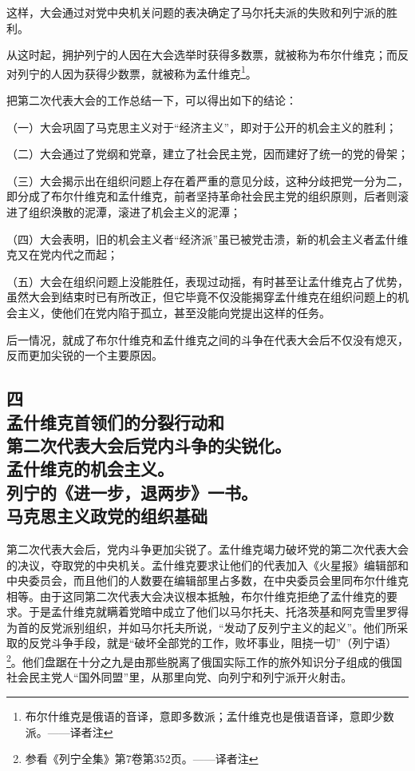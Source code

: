 这样，大会通过对党中央机关问题的表决确定了马尔托夫派的失败和列宁派的胜利。

从这时起，拥护列宁的人因在大会选举时获得多数票，就被称为布尔什维克；而反对列宁的人因为获得少数票，就被称为孟什维克\footnote{布尔什维克是俄语的音译，意即多数派；孟什维克也是俄语音译，意即少数派。——译者注}。

把第二次代表大会的工作总结一下，可以得出如下的结论：

（一）大会巩固了马克思主义对于“经济主义”，即对于公开的机会主义的胜利；

（二）大会通过了党纲和党章，建立了社会民主党，因而建好了统一的党的骨架；

（三）大会揭示出在组织问题上存在着严重的意见分歧，这种分歧把党一分为二，即分成了布尔什维克和孟什维克，前者坚持革命社会民主党的组织原则，后者则滚进了组织涣散的泥潭，滚进了机会主义的泥潭；

（四）大会表明，旧的机会主义者“经济派”虽已被党击溃，新的机会主义者孟什维克又在党内代之而起；

（五）大会在组织问题上没能胜任，表现过动摇，有时甚至让孟什维克占了优势，虽然大会到结束时已有所改正，但它毕竟不仅没能揭穿孟什维克在组织问题上的机会主义，使他们在党内陷于孤立，甚至没能向党提出这样的任务。

后一情况，就成了布尔什维克和孟什维克之间的斗争在代表大会后不仅没有熄灭，反而更加尖锐的一个主要原因。


\subsection[四\q 孟什维克首领们的分裂行动和第二次代表大会后党内斗争的尖锐化。孟什维克的机会主义。列宁的《进一步，退两步》一书。马克思主义政党的组织基础]{四\\ 孟什维克首领们的分裂行动和\\第二次代表大会后党内斗争的尖锐化。\\ 孟什维克的机会主义。\\ 列宁的《进一步，退两步》一书。\\ 马克思主义政党的组织基础}

第二次代表大会后，党内斗争更加尖锐了。孟什维克竭力破坏党的第二次代表大会的决议，夺取党的中央机关。孟什维克要求让他们的代表加入《火星报》编辑部和中央委员会，而且他们的人数要在编辑部里占多数，在中央委员会里同布尔什维克相等。由于这同第二次代表大会决议根本抵触，布尔什维克拒绝了孟什维克的要求。于是孟什维克就瞒着党暗中成立了他们以马尔托夫、托洛茨基和阿克雪里罗得为首的反党派别组织，并如马尔托夫所说，“发动了反列宁主义的起义”。他们所采取的反党斗争手段，就是“破坏全部党的工作，败坏事业，阻挠一切”（列宁语）\footnote{参看《列宁全集》第7卷第352页。——译者注}。他们盘踞在十分之九是由那些脱离了俄国实际工作的旅外知识分子组成的俄国社会民主党人“国外同盟”里，从那里向党、向列宁和列宁派开火射击。


